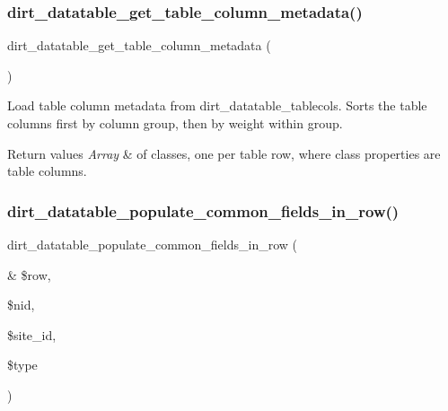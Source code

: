 \subsubsection{\texorpdfstring{dirt\+\_\+datatable\+\_\+get\+\_\+table\+\_\+column\+\_\+metadata()}{dirt\_datatable\_get\_table\_column\_metadata()}}
{\footnotesize\ttfamily dirt\+\_\+datatable\+\_\+get\+\_\+table\+\_\+column\+\_\+metadata (\begin{DoxyParamCaption}{ }\end{DoxyParamCaption})}

Load table column metadata from dirt\+\_\+datatable\+\_\+tablecols. Sorts the table columns first by column group, then by weight within group.


\begin{DoxyRetVals}{Return values}
{\em Array} & of classes, one per table row, where class properties are table columns. \\
\hline
\end{DoxyRetVals}
\mbox{\label{dirt__datatable_8search__table__db__ops_8inc_a1fd56ef9e9f99e25836a329400eb4102}} 
\subsubsection{\texorpdfstring{dirt\+\_\+datatable\+\_\+populate\+\_\+common\+\_\+fields\+\_\+in\+\_\+row()}{dirt\_datatable\_populate\_common\_fields\_in\_row()}}
{\footnotesize\ttfamily dirt\+\_\+datatable\+\_\+populate\+\_\+common\+\_\+fields\+\_\+in\+\_\+row (\begin{DoxyParamCaption}\item[{\&}]{\$row,  }\item[{}]{\$nid,  }\item[{}]{\$site\+\_\+id,  }\item[{}]{\$type }\end{DoxyParamCaption})}

